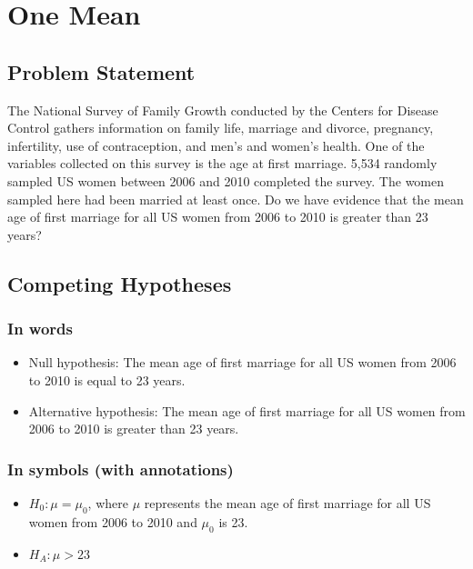\documentclass[]{tufte-book}
\providecommand{\tightlist}{%
  \setlength{\itemsep}{0pt}\setlength{\parskip}{0pt}}
\theoremstyle{definition}
\theoremstyle{definition}
\theoremstyle{remark}
\begin{document}
\section{One Mean}\label{one-mean}

\subsection{Problem Statement}\label{problem-statement}

The National Survey of Family Growth conducted by the Centers for
Disease Control gathers information on family life, marriage and
divorce, pregnancy, infertility, use of contraception, and men's and
women's health. One of the variables collected on this survey is the age
at first marriage. 5,534 randomly sampled US women between 2006 and 2010
completed the survey. The women sampled here had been married at least
once. Do we have evidence that the mean age of first marriage for all US
women from 2006 to 2010 is greater than 23 years? \citep[Tweaked a bit
from][ {[}Chapter 4{]}]{isrs2014}

\subsection{Competing Hypotheses}\label{competing-hypotheses}

\subsubsection{In words}\label{in-words}

\begin{itemize}
\item
  Null hypothesis: The mean age of first marriage for all US women from
  2006 to 2010 is equal to 23 years.
\item
  Alternative hypothesis: The mean age of first marriage for all US
  women from 2006 to 2010 is greater than 23 years.
\end{itemize}

\subsubsection{In symbols (with
annotations)}\label{in-symbols-with-annotations}

\begin{itemize}
\tightlist
\item
  \(H_0: \mu = \mu_{0}\), where \(\mu\) represents the mean age of first
  marriage for all US women from 2006 to 2010 and \(\mu_0\) is 23.
\item
  \(H_A: \mu > 23\)
\end{itemize}
\end{document}

